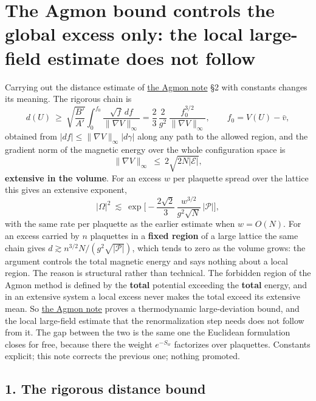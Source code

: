 \documentclass[11pt,a4paper]{article}
\begin{document}
\hypertarget{the-agmon-bound-controls-the-global-excess-only-the-local-large-field-estimate-does-not-follow}{%
\section{The Agmon bound controls the global excess only: the local
large-field estimate does not
follow}\label{the-agmon-bound-controls-the-global-excess-only-the-local-large-field-estimate-does-not-follow}}

Carrying out the distance estimate of
\href{agmon-ground-state-suppression.md}{the Agmon note} §2 with
constants changes its meaning. The rigorous chain is
\[d(U)\ \ge\ \sqrt{\frac{B'}{A'}}\int_0^{f_0}\frac{\sqrt f\,df}{\|\nabla V\|_\infty}
=\frac{2}{3}\,\frac{2}{g^2}\,\frac{f_0^{3/2}}{\|\nabla V\|_\infty},
\qquad f_0=V(U)-\bar v,\] obtained from
\(|df|\le\|\nabla V\|_\infty|d\gamma|\) along any path to the allowed
region, and the gradient norm of the magnetic energy over the whole
configuration space is
\[\|\nabla V\|_\infty\ \le\ 2\sqrt{2N|\mathcal E|},\] \textbf{extensive
in the volume}. For an excess \(w\) per plaquette spread over the
lattice this gives an extensive exponent,
\[\big|\Omega\big|^2\ \lesssim\ \exp\Big[-\frac{2\sqrt2}{3}\,\frac{w^{3/2}}{g^2\sqrt N}\,|\mathcal P|\Big],\]
with the same rate per plaquette as the earlier estimate when
\(w=O(N)\). For an excess carried by \(n\) plaquettes in a \textbf{fixed
region} of a large lattice the same chain gives
\(d\gtrsim n^{3/2}N/(g^2\sqrt{|\mathcal P|})\), which tends to zero as
the volume grows: the argument controls the total magnetic energy and
says nothing about a local region. The reason is structural rather than
technical. The forbidden region of the Agmon method is defined by the
\textbf{total} potential exceeding the \textbf{total} energy, and in an
extensive system a local excess never makes the total exceed its
extensive mean. So \href{agmon-ground-state-suppression.md}{the Agmon
note} proves a thermodynamic large-deviation bound, and the local
large-field estimate that the renormalization step needs does not follow
from it. The gap between the two is the same one the Euclidean
formulation closes for free, because there the weight \(e^{-S_w}\)
factorizes over plaquettes. Constants explicit; this note corrects the
previous one; nothing promoted.

\hypertarget{the-rigorous-distance-bound}{%
\subsection{1. The rigorous distance
bound}\label{the-rigorous-distance-bound}}
\end{document}

